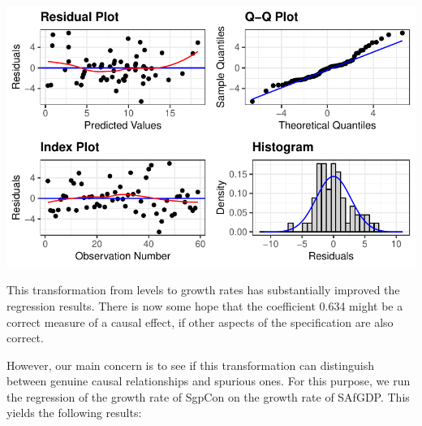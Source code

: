 \documentclass[
  letterpaper,
  DIV=11,
  numbers=noendperiod]{scrartcl}
\begin{document}
\includegraphics{Spurious-Regressions_files/figure-pdf/unnamed-chunk-6-2.pdf}

This transformation from levels to growth rates has substantially
improved the regression results. There is now some hope that the
coefficient 0.634 might be a correct measure of a causal effect, if
other aspects of the specification are also correct.

However, our main concern is to see if this transformation can
distinguish between genuine causal relationships and spurious ones. For
this purpose, we run the regression of the growth rate of SgpCon on the
growth rate of SAfGDP. This yields the following results:

 
  \providecommand{\huxb}[2]{\arrayrulecolor[RGB]{#1}\global\arrayrulewidth=#2pt}
  \providecommand{\huxvb}[2]{\color[RGB]{#1}\vrule width #2pt}
  \providecommand{\huxtpad}[1]{\rule{0pt}{#1}}
  \providecommand{\huxbpad}[1]{\rule[-#1]{0pt}{#1}}
\end{document}
